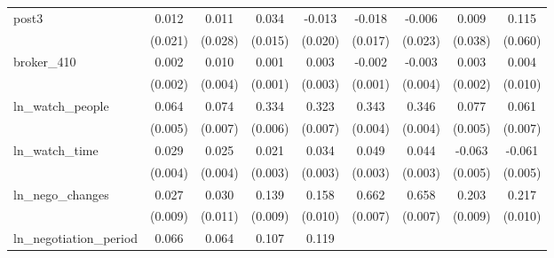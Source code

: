 {\begin{adjustbox}{max width=\textwidth}
\begin{tabular}{l*{8}{c}}
\addlinespace
post3       &       0.012         &       0.011         &       0.034\sym{**} &      -0.013         &      -0.018         &      -0.006         &       0.009         &       0.115\sym{*}  \\
            &     (0.021)         &     (0.028)         &     (0.015)         &     (0.020)         &     (0.017)         &     (0.023)         &     (0.038)         &     (0.060)         \\
\addlinespace
broker\_410  &       0.002         &       0.010\sym{**} &       0.001         &       0.003         &      -0.002\sym{*}  &      -0.003         &       0.003         &       0.004         \\
            &     (0.002)         &     (0.004)         &     (0.001)         &     (0.003)         &     (0.001)         &     (0.004)         &     (0.002)         &     (0.010)         \\
\addlinespace
ln\_watch\_people&       0.064\sym{***}&       0.074\sym{***}&       0.334\sym{***}&       0.323\sym{***}&       0.343\sym{***}&       0.346\sym{***}&       0.077\sym{***}&       0.061\sym{***}\\
            &     (0.005)         &     (0.007)         &     (0.006)         &     (0.007)         &     (0.004)         &     (0.004)         &     (0.005)         &     (0.007)         \\
\addlinespace
ln\_watch\_time&       0.029\sym{***}&       0.025\sym{***}&       0.021\sym{***}&       0.034\sym{***}&       0.049\sym{***}&       0.044\sym{***}&      -0.063\sym{***}&      -0.061\sym{***}\\
            &     (0.004)         &     (0.004)         &     (0.003)         &     (0.003)         &     (0.003)         &     (0.003)         &     (0.005)         &     (0.005)         \\
\addlinespace
ln\_nego\_changes&       0.027\sym{***}&       0.030\sym{***}&       0.139\sym{***}&       0.158\sym{***}&       0.662\sym{***}&       0.658\sym{***}&       0.203\sym{***}&       0.217\sym{***}\\
            &     (0.009)         &     (0.011)         &     (0.009)         &     (0.010)         &     (0.007)         &     (0.007)         &     (0.009)         &     (0.010)         \\
\addlinespace
ln\_negotiation\_period&       0.066\sym{***}&       0.064\sym{***}&       0.107\sym{***}&       0.119\sym{***}&                     &                     &                     &                     \\

\end{tabular}
\end{adjustbox}}
